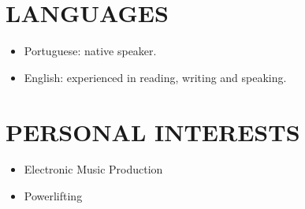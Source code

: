 \documentclass[margin]{res}
\begin{document}
\begin{resume}
\section{LANGUAGES}
      \begin{itemize}
        \item Portuguese: native speaker.
        \item English: experienced in reading, writing and speaking.
      \end{itemize}

\section{PERSONAL INTERESTS}

   \begin{itemize}
      \item Electronic Music Production
      \item Powerlifting
   \end{itemize}

\end{resume}
\end{document}
